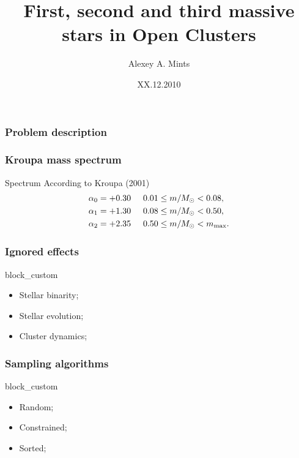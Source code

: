 \documentclass[14pt,green]{beamer}
\author{Alexey A. Mints}
\title[Massive stars in Open Clusters]{First, second and third massive stars in Open Clusters}
\date{XX.12.2010}
\newcommand{\MSun}{M_\odot}
\newcommand{\Mmax}{m_{\mathrm{max}}}
\begin{document}
\frame[plain]{
  \titlepage
}


\begin{frame}
  \frametitle{Problem description}
  \begin{figure}
  \end{figure}

\end{frame}

\begin{frame}
  \frametitle{Kroupa mass spectrum}
  \begin{beamerboxesrounded}{Spectrum}
  According to Kroupa (2001)
  \begin{align}
  \alpha_0 = +0.30 &\hspace{0.5cm} 0.01 \leq m/\MSun < 0.08, \nonumber \\
  \alpha_1 = +1.30 &\hspace{0.5cm} 0.08 \leq m/\MSun < 0.50, \nonumber \\ 
  \alpha_2 = +2.35 &\hspace{0.5cm} 0.50 \leq m/\MSun < \Mmax. \nonumber 
  \end{align}     
  \end{beamerboxesrounded}
\end{frame}

\begin{frame}
  \frametitle{Ignored effects}
  \begin{beamercolorbox}[center, rounded=true]{block_custom}
   \begin{itemize}
    \item Stellar binarity;
    \item Stellar evolution;
    \item Cluster dynamics;
   \end{itemize}
  \end{beamercolorbox}
\end{frame}

\begin{frame}
  \frametitle{Sampling algorithms}
  \begin{beamercolorbox}[center, rounded=true]{block_custom}
   \begin{itemize}
    \item<+-> Random;
    \item<+-> Constrained;
    \item<+-> Sorted;
   \end{itemize}
  \end{beamercolorbox}
\end{frame}
\end{document}
